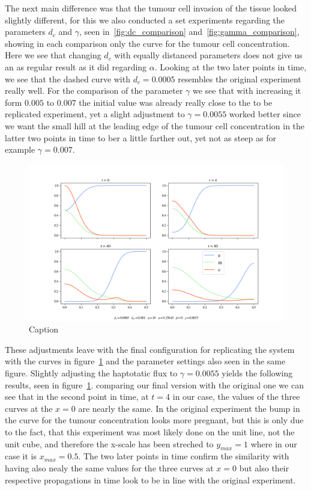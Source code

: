 The next main difference was that the tumour cell invasion of the tissue looked slightly different, for this we also conducted a set experiments regarding the parameters $d_c$ and $\gamma$, seen in~\ref{fig:dc_comparison} and~\ref{fig:gamma_comparison}, showing in each comparison only the curve for the tumour cell concentration. Here we see that changing $d_c$ with equally distanced parameters does not give us an as regular result as it did regarding $\alpha$. Looking at the two later points in time, we see that the dashed curve with $d_c=0.0005$ resembles the original experiment really well. For the comparison of the parameter $\gamma$ we see that with increasing it form $0.005$ to $0.007$ the initial value was already really close to the to be replicated experiment, yet a slight adjustment to $\gamma = 0.0055$ worked better since we want the small hill at the leading edge of the tumour cell concentration in the latter two points in time to ber a little farther out, yet not as steep as for example $\gamma = 0.007$. \newline 
\begin{figure}[t]
    \centering
    \includegraphics[width=\textwidth]{resources/images/2D_5e-4_1e-3_1e-3_10_0.35645_0_0.0055_1e-2_10_plot.png}
    \caption{Caption}
    \label{fig:2D_5e-4_1e-3_1e-3_10_0.35645_0_0.0055}
\end{figure}
These adjustments leave with the final configuration for replicating the system with the curves in figure~\ref{fig:2D_5e-4_1e-3_1e-3_10_0.35645_0_0.0055} and the parameter settings also seen in the same figure.
Slightly adjusting the haptotatic flux to $\gamma=0.0055$ yields the following results, seen in figure~\ref{fig:2D_5e-4_1e-3_1e-3_10_0.35645_0_0.0055}. comparing our final version with the original one we can see that in the second point in time, at $t=4$ in our case, the values of the three curves at the $x=0$ are nearly the same. In the original experiment the bump in the curve for the tumour concentration looks more pregnant, but this is only due to the fact, that this experiment was most likely done on the unit line, not the unit cube, and therefore the x-scale has been streched to $y_{max}=1$ where in our case it is $x_{max} = 0.5$. The two later points in time confirm the similarity with having also nealy the same values for the three curves at $x=0$ but also their respective propagations in time look to be in line with the original experiment. 


